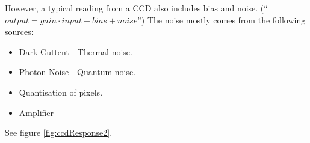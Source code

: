 \documentclass{article}
\begin{document}
However, a typical reading from a CCD also includes bias and noise.
(``$output = gain \cdot input + bias + noise$'')
The noise mostly comes from the following sources:
\begin{itemize}
	\item Dark Cuttent - Thermal noise.
	\item Photon Noise - Quantum noise.
	\item Quantisation of pixels.
	\item Amplifier
\end{itemize}
See figure \ref{fig:ccdResponse2}.
\end{document}
